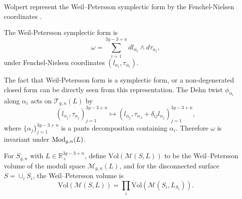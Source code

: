  Wolpert represent the Weil--Petersson symplectic form  by the Fenchel-Nielsen coordinates \cite{wolpertformula}.
 \begin{theorem}\label{wpmetricWolpert}
 The Weil-Petersson symplectic form is 
 $$
 \omega=\sum_{i=1}^{3g-3+n}dl_{\alpha_i}\wedge d\tau_{\alpha_i},
 $$ under Fenchel-Nielsen coordinates $(l_{\alpha_i},\tau_{\alpha_i})$.
 \end{theorem}
 
\begin{remark}
The fact that Weil-Petersson form is a symplectic form, or a non-degenerated closed form can be  directly  seen from this representation. 
The Dehn twist $\phi_{\alpha_i}$ along $\alpha_i$ acts on $\mathscr{T}_{g,n}(L)$ by 
$$
(l_{\alpha_j},\tau_{\alpha_j})_{j=1}^{3g-3+n}\mapsto
(l_{\alpha_j},\tau_{\alpha_J}+\delta_{ij}l_{\alpha_j})_{j=1}^{3g-3+n},
$$
where $\{\alpha_{j}\}_{j=1}^{3g-3+n}$ is a pants decomposition containing $\alpha_i$.
Therefore $\omega$ is invariant under $\operatorname{Mod}_{g,n}(L)$.
\end{remark}

For $S_{g,n}$ with $L\in \mathbb{R}_+^{3g-3+n}$, define $\mathrm{Vol}(\mathscr{M}(S,L))$ to be the Weil--Petersson volume of the moduli space $\mathscr{M}_{g,n}(L)$,  and for the disconnected surface $S=\cup_{i}S_i$, the Weil--Petersson volume is $$
\mathrm{Vol}(\mathscr{M}(S,L))=\prod_{i}\mathrm{Vol}(\mathscr{M}(S_i,L_{S_i})).
$$





